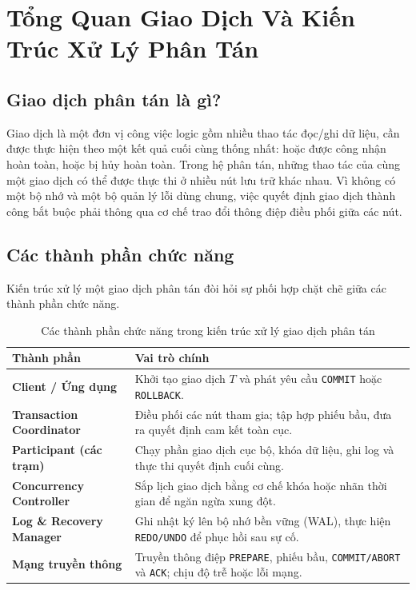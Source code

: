 \documentclass[12pt,a4paper]{report}
\renewcommand{\baselinestretch}{1.3} %
\begin{document}
\section{Tổng Quan Giao Dịch Và Kiến Trúc Xử Lý Phân Tán}

\subsection{Giao dịch phân tán là gì?}
Giao dịch là một đơn vị công việc logic gồm nhiều thao tác đọc/ghi dữ liệu, cần được thực hiện theo một kết quả cuối cùng thống nhất: hoặc được công nhận hoàn toàn, hoặc bị hủy hoàn toàn. Trong hệ phân tán, những thao tác của cùng một giao dịch có thể được thực thi ở nhiều nút lưu trữ khác nhau. Vì không có một bộ nhớ và một bộ quản lý lỗi dùng chung, việc quyết định giao dịch thành công bắt buộc phải thông qua cơ chế trao đổi thông điệp điều phối giữa các nút.

\subsection{Các thành phần chức năng}
Kiến trúc xử lý một giao dịch phân tán đòi hỏi sự phối hợp chặt chẽ giữa các thành phần chức năng.
\begin{table}[H]
\centering
\footnotesize
\renewcommand{\baselinestretch}{1.0}\selectfont %
\label{tab:cac_thanh_phan_chuc_nang}
\renewcommand{\arraystretch}{1.15}
\begin{tabularx}{\textwidth}{|>{\raggedright\arraybackslash\bfseries}p{3.9cm}|>{\raggedright\arraybackslash}X|}
\hline
\textbf{Thành phần} & \textbf{Vai trò chính} \\ \hline
Client / Ứng dụng & Khởi tạo giao dịch $T$ và phát yêu cầu \texttt{COMMIT} hoặc \texttt{ROLLBACK}. \\ \hline
Transaction Coordinator & Điều phối các nút tham gia; tập hợp phiếu bầu, đưa ra quyết định cam kết toàn cục. \\ \hline
Participant (các trạm) & Chạy phần giao dịch cục bộ, khóa dữ liệu, ghi log và thực thi quyết định cuối cùng. \\ \hline
Concurrency Controller & Sắp lịch giao dịch bằng cơ chế khóa hoặc nhãn thời gian để ngăn ngừa xung đột. \\ \hline
Log \& Recovery Manager & Ghi nhật ký lên bộ nhớ bền vững (WAL), thực hiện \texttt{REDO/UNDO} để phục hồi sau sự cố. \\ \hline
Mạng truyền thông & Truyền thông điệp \texttt{PREPARE}, phiếu bầu, \texttt{COMMIT/ABORT} và \texttt{ACK}; chịu độ trễ hoặc lỗi mạng. \\ \hline
\end{tabularx}
\caption{Các thành phần chức năng trong kiến trúc xử lý giao dịch phân tán}
\end{table}
\end{document}
